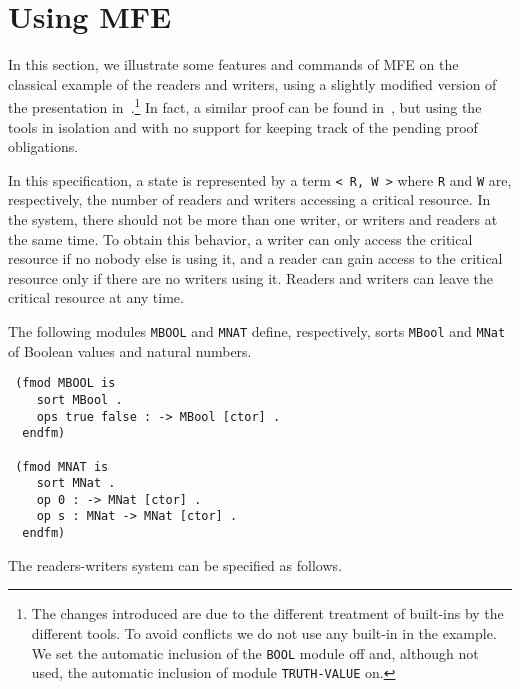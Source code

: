 \section{Using MFE}
\label{sec.example}

In this section, we illustrate some features and commands of 
MFE on the classical example of the
readers and writers, using a slightly modified version of the 
presentation in~\cite[Sections 12.3 and 12.4]{CDELMMT:2007-book}.\footnote{The changes introduced are due to the different treatment of built-ins by the different tools. To avoid conflicts we do not use any built-in in the example. We set the automatic inclusion of the \texttt{BOOL} module off and, although not used, the automatic inclusion of module \texttt{TRUTH-VALUE} on.}
In fact, a similar proof can be found in~\cite{CDELMMT:2007-book},
but using the tools in isolation and with no support for keeping track of the pending proof obligations. 

In this specification, a state is represented by a term \verb~< R, W >~ 
where \verb~R~ and \verb~W~ are, respectively, the number of readers and
writers accessing a critical resource. In the system, there should not be more 
than one writer, or writers and readers at the same time. 
To obtain this behavior, a writer can only access the critical resource if no 
nobody else is using it, and a reader can gain access to the critical resource only if there are 
no writers using it. Readers and writers can leave the critical resource at any time.

The following modules \verb~MBOOL~ and \verb~MNAT~ define, respectively, sorts 
\verb~MBool~ and \verb~MNat~ of Boolean values and natural numbers. 

\begin{small}
\begin{verbatim}
 (fmod MBOOL is
    sort MBool .
    ops true false : -> MBool [ctor] .
  endfm) 

 (fmod MNAT is
    sort MNat .
    op 0 : -> MNat [ctor] .
    op s : MNat -> MNat [ctor] .
  endfm) 
\end{verbatim}
\end{small}
%
The readers-writers system can be specified as follows.

